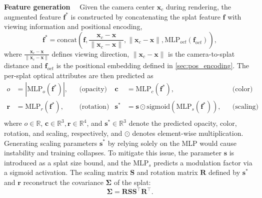 \documentclass{article}
\def\vc{{\bm{c}}}
\def\vf{{\bm{f}}}
\def\vr{{\bm{r}}}
\def\vs{{\bm{s}}}
\def\vx{{\bm{x}}}
\def\mR{{\bm{R}}}
\def\mS{{\bm{S}}}
\newcommand{\MLP}{\mathrm{MLP}}
\renewcommand{\paragraph}[1]{\noindent\textbf{#1}~~}
\begin{document}
\paragraph{Feature generation} Given the camera center $\vx_c$ during rendering, the augmented feature $\vf^*$ is constructed by concatenating the splat feature $\vf$ with viewing information and positional encoding,
\begin{equation}
  \label{eq:view_concat}
  \vf^* = \mathrm{concat}\left(\vf, \frac{\vx_c - \vx}{\|\vx_c - \vx\|}, \|\vx_c - \vx\|, \MLP_{oct}(\vf_{oct})\right),
\end{equation}
where $ \frac{\vx_c - \vx}{\|\vx_c - \vx\|}$ defines viewing direction,  $\|\vx_c - \vx\|$ is the camera-to-splat distance and $\vf_{oct}$ is the positional embedding defined in \cref{sec:pos_encoding}.
The per-splat optical attributes are then predicted as
\begin{equation}
  \begin{aligned}
  o &= |\MLP_{o}(\vf^*)|, &&\text{(opacity)} &
  \vc &= \MLP_{c}(\vf^*), &&\text{(color)} \\
  \vr &= \MLP_{r}(\vf^*), &&\text{(rotation)} &
  \vs^* &= \vs \odot \mathrm{sigmoid}(\MLP_{s}(\vf^*)), &&\text{(scaling)} \\
  \end{aligned} 
\end{equation}
where $o \in \mathbb{R}$, $\vc \in \mathbb{R}^3, \vr \in \mathbb{R}^4$, and $\vs^* \in \mathbb{R}^3$ denote the predicted opacity, color, rotation, and scaling, respectively, and $\odot$ denotes element-wise multiplication.  
Generating scaling parameters $\vs^*$ by relying solely on the MLP would cause instability and training collapses. To mitigate this issue, the parameter $\vs$ is introduced as a splat size bound, and the $\MLP_s$ predicts a modulation factor via a sigmoid activation. 
The scaling matrix $\mS$ and rotation matrix $\mR$ defined by $\vs^*$ and $\vr$ reconstruct the covariance $\bm{\Sigma}$ of the splat:
\begin{equation}
  \bm{\Sigma} = \mR \mS \mS^\top \mR^\top.
\end{equation}
\end{document}
